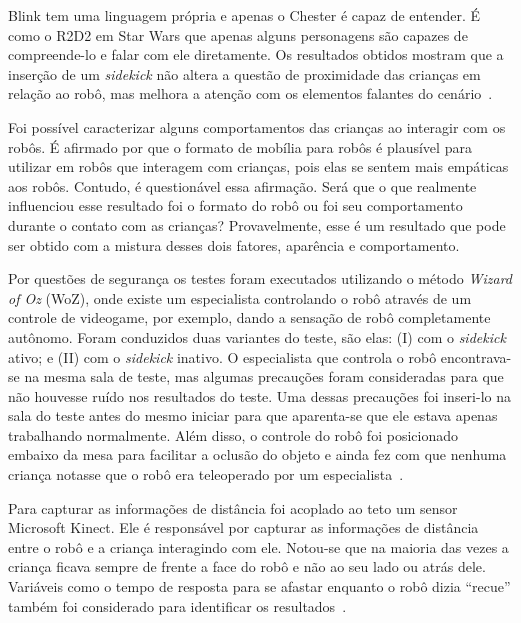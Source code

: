 Blink tem uma linguagem própria e apenas o Chester é capaz de entender. É como o R2D2 em Star Wars que apenas alguns personagens são capazes de compreende-lo e falar com ele diretamente. Os resultados obtidos mostram que a inserção de um \emph{sidekick} não altera a questão de proximidade das crianças em relação ao robô, mas melhora a atenção com os elementos falantes do cenário~\cite{Vazquez:2014}.

Foi possível caracterizar alguns comportamentos das crianças ao interagir com os robôs. É afirmado por  que o formato de mobília para robôs é plausível para utilizar em robôs que interagem com crianças, pois elas se sentem mais empáticas aos robôs. Contudo, é questionável essa afirmação. Será que o que realmente influenciou esse resultado foi o formato do robô ou foi seu comportamento durante o contato com as crianças? Provavelmente, esse é um resultado que pode ser obtido com a mistura desses dois fatores, aparência e comportamento.

Por questões de segurança os testes foram executados utilizando o método \emph{Wizard of Oz} (WoZ), onde existe um especialista controlando o robô através de um controle de videogame, por exemplo, dando a sensação de robô completamente autônomo. Foram conduzidos duas variantes do teste, são elas: (I) com o \emph{sidekick} ativo; e (II) com o \emph{sidekick} inativo. O especialista que controla o robô encontrava-se na mesma sala de teste, mas algumas precauções foram consideradas para que não houvesse ruído nos resultados do teste. Uma dessas precauções foi inseri-lo na sala do teste antes do mesmo iniciar para que aparenta-se que ele estava apenas trabalhando normalmente. Além disso, o controle do robô foi posicionado embaixo da mesa para facilitar a oclusão do objeto e ainda fez com que nenhuma criança notasse que o robô era teleoperado por um especialista~\cite{Vazquez:2014}.

Para capturar as informações de distância foi acoplado ao teto um sensor Microsoft Kinect. Ele é responsável por capturar as informações de distância entre o robô e a criança interagindo com ele. Notou-se que na maioria das vezes a criança ficava sempre de frente a face do robô e não ao seu lado ou atrás dele. Variáveis como o tempo de resposta para se afastar enquanto o robô dizia ``recue'' também foi considerado para identificar os resultados~\cite{Vazquez:2014}.

